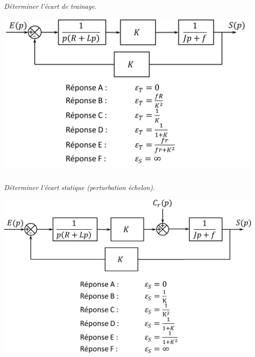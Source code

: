 \documentclass[10pt,fleqn]{article} %
\begin{document}
\begin{multicols}{2}
\subparagraph{}\textit{Déterminer l'écart de trainage.}
\begin{center}
\includegraphics[width=\linewidth]{06}
\end{center}

\subparagraph{}\textit{Déterminer l'écart statique (perturbation échelon).}
\begin{center}
\includegraphics[width=\linewidth]{07}
\end{center}

\end{multicols}
\end{document}

